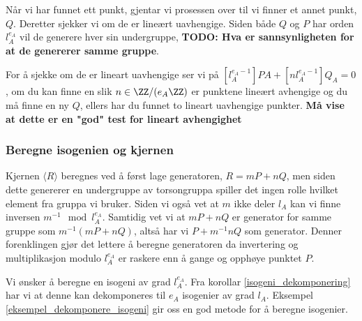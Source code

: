 Når vi har funnet ett punkt, gjentar vi prosessen over til vi finner et annet punkt, $Q$. Deretter sjekker vi om de er lineært uavhengige. Siden både $Q$ og $P$ har orden $l_A^{e_A}$ vil de generere hver sin undergruppe, \textbf{TODO: Hva er sannsynligheten for at de genererer samme gruppe}.  

For å sjekke om de er lineart uavhengige ser vi på $[l_A^{e_A - 1}]PA + [n l_A^{e_A - 1}]Q_A = 0$, om du kan finne en slik $n \in \ZZ/(e_A \ZZ)$ er punktene lineært avhengige og du må finne en ny $Q$, ellers har du funnet to lineart uavhengige punkter. \textbf{Må vise at dette er en "god" test for lineart avhengighet}
\subsubsection{Beregne isogenien og kjernen}
Kjernen $\langle R \rangle$ beregnes ved å først lage generatoren, $R = mP + nQ$, men siden dette genererer en undergruppe av torsongruppa spiller det ingen rolle hvilket element fra gruppa vi bruker. Siden vi også vet at $m$ ikke deler $l_A$ kan vi finne inversen $m^{-1} \mod{l_A^{e_A}}$. Samtidig vet vi at $mP + nQ$ er generator for samme gruppe som $m^{-1}(mP + nQ)$, altså har vi $P + m^{-1}nQ$ som generator. Denner forenklingen gjør det lettere å beregne generatoren da invertering og multiplikasjon modulo $l_A^{e_A}$ er raskere enn å gange og opphøye punktet $P$. 

Vi ønsker å beregne en isogeni av grad $l_A^{e_A}$. Fra korollar \ref{isogeni_dekomponering} har vi at denne kan dekomponeres til $e_A$ isogenier av grad $l_A$. Eksempel \ref{eksempel_dekomponere_isogeni} gir  oss en god metode for å beregne isogenier.
